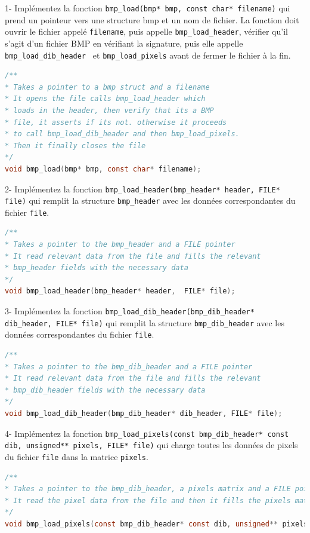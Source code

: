 \documentclass[a4paper]{article}
\begin{document}
	1- Implémentez la fonction \texttt{bmp\_load(bmp* bmp, const char* filename)} qui prend un pointeur vers une structure bmp et un nom de fichier. La fonction doit ouvrir le fichier appelé \texttt{filename}, puis appelle \texttt{bmp\_load\_header}, vérifier qu'il s'agit d'un fichier BMP en vérifiant la signature, puis elle appelle \texttt{bmp\_load\_dib\_header } et \texttt{bmp\_load\_pixels} avant de fermer le fichier à la fin.
	\begin{lstlisting}[language=C]
/**
* Takes a pointer to a bmp struct and a filename
* It opens the file calls bmp_load_header which 
* loads in the header, then verify that its a BMP 
* file, it asserts if its not. otherwise it proceeds
* to call bmp_load_dib_header and then bmp_load_pixels.
* Then it finally closes the file
*/
void bmp_load(bmp* bmp, const char* filename);
	\end{lstlisting}
	2- Implémentez la fonction \texttt{bmp\_load\_header(bmp\_header* header, FILE* file)} qui remplit la structure \texttt{bmp\_header} avec les données correspondantes du fichier \texttt{file}.
	\begin{lstlisting}[language=C]
/**
* Takes a pointer to the bmp_header and a FILE pointer
* It read relevant data from the file and fills the relevant
* bmp_header fields with the necessary data
*/
void bmp_load_header(bmp_header* header,  FILE* file);
	\end{lstlisting}
	3- Implémentez la fonction \texttt{bmp\_load\_dib\_header(bmp\_dib\_header* dib\_header, FILE* file)} qui remplit la structure \texttt{bmp\_dib\_header} avec les données correspondantes du fichier \texttt{file}.
	\begin{lstlisting}[language=C]
/**
* Takes a pointer to the bmp_dib_header and a FILE pointer
* It read relevant data from the file and fills the relevant
* bmp_dib_header fields with the necessary data
*/
void bmp_load_dib_header(bmp_dib_header* dib_header, FILE* file);
	\end{lstlisting}
	4- Implémentez la fonction \texttt{bmp\_load\_pixels(const bmp\_dib\_header* const dib, unsigned** pixels, FILE* file)} qui charge toutes les données de pixels du fichier \texttt{file} dans la matrice \texttt{pixels}.
	\begin{lstlisting}[language=C]
/**
* Takes a pointer to the bmp_dib_header, a pixels matrix and a FILE pointer
* It read the pixel data from the file and then it fills the pixels matrix
*/
void bmp_load_pixels(const bmp_dib_header* const dib, unsigned** pixels, FILE* file);
	\end{lstlisting}
	
\end{document}
